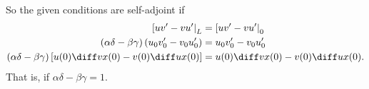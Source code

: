 {So the given conditions are self-adjoint if
%
\begin{align*}
	\L[uv'-vu'\R|_L&=\L[uv'-vu'\R|_0\\
	(\alpha\delta-\beta\gamma)\L(u_0v_0' - v_0u_0' \R) &= u_0v_0' - v_0u_0'\\
	(\alpha\delta-\beta\gamma)\L[u(0)\D{v}{x}(0) - v(0)\D{u}{x}(0) \R] &= u(0) \D{v}{x}(0) -  v(0)\D{u}{x}(0).
\end{align*}
%
That is, if $\alpha\delta-\beta\gamma =1$.
}

